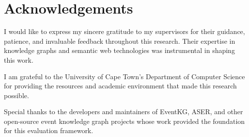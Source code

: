 \section*{Acknowledgements}

I would like to express my sincere gratitude to my supervisors for their guidance, patience, and invaluable feedback throughout this research. Their expertise in knowledge graphs and semantic web technologies was instrumental in shaping this work.

I am grateful to the University of Cape Town's Department of Computer Science for providing the resources and academic environment that made this research possible.

Special thanks to the developers and maintainers of EventKG, ASER, and other open-source event knowledge graph projects whose work provided the foundation for this evaluation framework.

